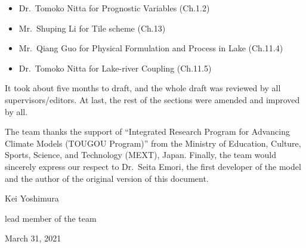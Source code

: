 \begin{itemize}
\item
  Dr.~Tomoko Nitta for Prognostic Variables (Ch.1.2)
\item
  Mr.~Shuping Li for Tile scheme (Ch.13)
\item
  Mr.~Qiang Guo for Physical Formulation and Process in Lake (Ch.11.4)
\item
  Dr.~Tomoko Nitta for Lake-river Coupling (Ch.11.5)
\end{itemize}

It took about five months to draft, and the whole draft was reviewed by all supervisors/editors. At last, the rest of the sections were amended and improved by all.

The team thanks the support of ``Integrated Research Program for Advancing Climate Models (TOUGOU Program)'' from the Ministry of Education, Culture, Sports, Science, and Technology (MEXT), Japan.
Finally, the team would sincerely express our respect to Dr.~Seita Emori, the first developer of the model and the author of the original version of this document.

\begin{flushright}

Kei Yoshimura

lead member of the team

March 31, 2021
\end{flushright}
